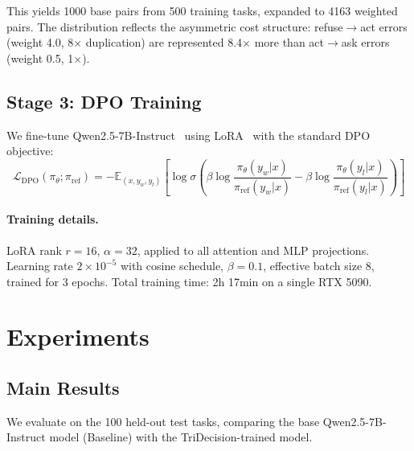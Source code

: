 \documentclass{article}
\begin{document}
This yields 1000 base pairs from 500 training tasks, expanded to 4163 weighted pairs. The distribution reflects the asymmetric cost structure: refuse$\to$act errors (weight 4.0, 8$\times$ duplication) are represented 8.4$\times$ more than act$\to$ask errors (weight 0.5, 1$\times$).

\subsection{Stage 3: DPO Training}

We fine-tune Qwen2.5-7B-Instruct~\cite{qwen2025} using LoRA~\cite{hu2022lora} with the standard DPO objective:
\begin{equation}
\mathcal{L}_\text{DPO}(\pi_\theta; \pi_\text{ref}) = -\mathbb{E}_{(x, y_w, y_l)} \left[ \log \sigma \left( \beta \log \frac{\pi_\theta(y_w|x)}{\pi_\text{ref}(y_w|x)} - \beta \log \frac{\pi_\theta(y_l|x)}{\pi_\text{ref}(y_l|x)} \right) \right]
\end{equation}

\paragraph{Training details.} LoRA rank $r=16$, $\alpha=32$, applied to all attention and MLP projections. Learning rate $2 \times 10^{-5}$ with cosine schedule, $\beta=0.1$, effective batch size 8, trained for 3 epochs. Total training time: 2h 17min on a single RTX 5090.


\section{Experiments}
\label{sec:experiments}

\subsection{Main Results}

We evaluate on the 100 held-out test tasks, comparing the base Qwen2.5-7B-Instruct model (Baseline) with the TriDecision-trained model.
\end{document}
